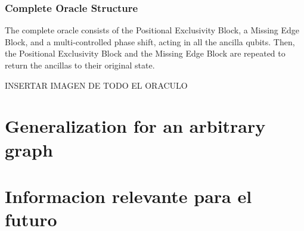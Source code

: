 \documentclass[10pt,a4paper]{article}
\begin{document}
\subsubsection{Complete Oracle Structure}
The complete oracle consists of the Positional Exclusivity Block, a Missing Edge Block, and a multi-controlled phase shift, acting in all the ancilla qubits. Then, the Positional Exclusivity Block and the Missing Edge Block are repeated to return the ancillas to their original state.

INSERTAR IMAGEN DE TODO EL ORACULO

\section{Generalization for an arbitrary graph}



\section{Informacion relevante para el futuro}


 

\end{document}
